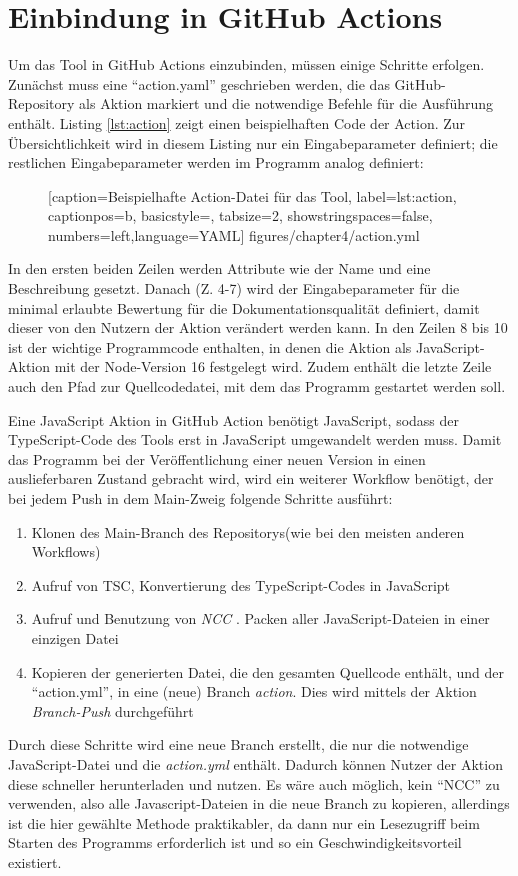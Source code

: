   
\section{Einbindung in GitHub Actions}\label{chapter:github_actions_impl}
Um das Tool in GitHub Actions einzubinden, müssen einige Schritte erfolgen. Zunächst muss eine \enquote{action.yaml} geschrieben werden, die das GitHub-Repository als Aktion markiert und die notwendige Befehle für die Ausführung enthält. Listing  \ref{lst:action} zeigt einen beispielhaften Code der Action. Zur Übersichtlichkeit wird in diesem Listing nur ein Eingabeparameter definiert; die restlichen Eingabeparameter werden im Programm analog definiert:
\begin{figure} [htbp]

[caption={Beispielhafte Action-Datei für das Tool},
label={lst:action},
captionpos=b, basicstyle=\footnotesize, tabsize=2, showstringspaces=false,  numbers=left,language=YAML]
{figures/chapter4/action.yml}
\end{figure}

In den ersten beiden Zeilen werden Attribute wie der Name und eine Beschreibung gesetzt. Danach (Z. 4-7) wird der Eingabeparameter für die minimal erlaubte Bewertung für die Dokumentationsqualität definiert, damit dieser von den Nutzern der Aktion verändert werden kann. In den Zeilen 8 bis 10 ist der wichtige Programmcode enthalten, in denen die Aktion als JavaScript-Aktion mit der Node-Version 16 festgelegt wird. Zudem enthält die letzte Zeile auch den Pfad zur Quellcodedatei, mit dem das Programm gestartet werden soll. 

\bigskip
Eine JavaScript Aktion in GitHub Action benötigt JavaScript, sodass der TypeScript-Code des Tools erst in JavaScript umgewandelt werden muss. Damit das Programm bei der Veröffentlichung einer neuen Version in einen auslieferbaren Zustand gebracht wird, wird ein weiterer Workflow benötigt, der bei jedem Push in dem Main-Zweig folgende Schritte ausführt:
\begin{enumerate}
    \item Klonen des Main-Branch des Repositorys(wie bei den meisten anderen Workflows)
    \item Aufruf von TSC, Konvertierung des TypeScript-Codes in JavaScript
    \item Aufruf und Benutzung von \textit{NCC}       \cite{ncc}. Packen aller JavaScript-Dateien in einer einzigen Datei
    \item Kopieren der generierten Datei, die den gesamten Quellcode enthält, und der \enquote{action.yml}, in eine (neue) Branch \textit{action}. Dies wird mittels der Aktion \textit{Branch-Push} \cite{Branch-Push} durchgeführt
\end{enumerate}
Durch diese Schritte wird eine neue Branch erstellt, die nur die notwendige JavaScript-Datei und die \textit{action.yml} enthält. Dadurch können Nutzer der Aktion diese schneller herunterladen und nutzen. Es wäre auch möglich, kein \enquote{NCC} zu verwenden, also alle Javascript-Dateien in die neue Branch zu kopieren, allerdings ist die hier gewählte Methode praktikabler, da dann nur ein Lesezugriff beim Starten des Programms erforderlich ist und so ein Geschwindigkeitsvorteil existiert. 

